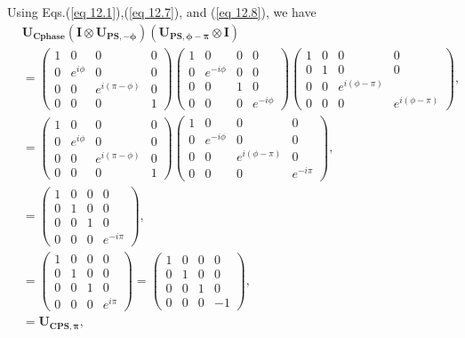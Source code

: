 \documentclass{article}
\begin{document}
Using Eqs.(\ref{eq 12.1}),(\ref{eq 12.7}), and (\ref{eq 12.8}), we have
\begin{align*}\label{eq 12.9}
 & \boldsymbol{U_{Cphase}}(\boldsymbol{I}\otimes\boldsymbol{U_{PS,-\phi}})
(\boldsymbol{U_{PS,\phi-\pi}}\otimes\boldsymbol{I})\\[5pt]
&=\begin{pmatrix}
  1&0&0&0\\0&e^{i\phi}&0&0\\0&0&e^{i(\pi-\phi)}&0\\0&0&0&1
\end{pmatrix}
\begin{pmatrix}
  1&0&0&0\\0&e^{-i\phi}&0&0\\0&0&1&0\\0&0&0&e^{-i\phi}
\end{pmatrix}
\begin{pmatrix}
  1&0&0&0\\0&1&0&0\\0&0&e^{i(\phi-\pi)}\\0&0&0&e^{i(\phi-\pi)}
\end{pmatrix},\\[5pt]
&=\begin{pmatrix}
  1&0&0&0\\0&e^{i\phi}&0&0\\0&0&e^{i(\pi-\phi)}&0\\0&0&0&1
\end{pmatrix}
\begin{pmatrix}
  1&0&0&0\\0&e^{-i\phi}&0&0\\0&0&e^{i(\phi-\pi)}&0\\0&0&0&e^{-i\pi}
\end{pmatrix},\\[5pt]
&=\begin{pmatrix}
  1&0&0&0\\0&1&0&0\\0&0&1&0\\0&0&0&e^{-i\pi}
\end{pmatrix},\\[5pt]
&=\begin{pmatrix}
  1&0&0&0\\0&1&0&0\\0&0&1&0\\0&0&0&e^{i\pi}
\end{pmatrix}=
\begin{pmatrix}
  1&0&0&0\\0&1&0&0\\0&0&1&0\\0&0&0&-1
\end{pmatrix},\\[5pt]
&=\boldsymbol{U_{CPS,\pi}},\tag{12.9}
\end{align*}
\end{document}
